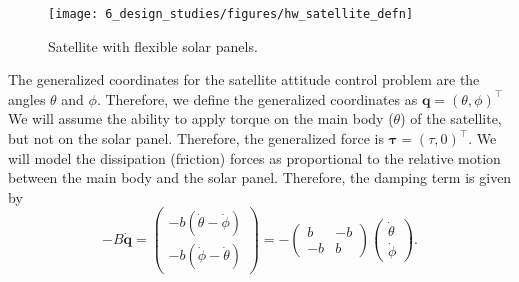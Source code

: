 
\begin{figure}[hbt]
  \centering\texttt{[image: 6\_design\_studies/figures/hw\_satellite\_defn]}
  \caption{Satellite with flexible solar panels.}
  \label{fig:sm_satellite_defn}  
\end{figure}



The generalized coordinates for the satellite attitude control problem are the angles $\theta$ and $\phi$.  Therefore, we define the generalized coordinates as $\mathbf{q}=(\theta, \phi)^\top$  We will assume the ability to apply torque on the main body ($\theta$) of the satellite, but not on the solar panel.  Therefore, the generalized force is $\boldsymbol{\tau} = (\tau, 0)^\top$.  We will model the dissipation (friction) forces as proportional to the relative motion between the main body and the solar panel.  Therefore, the damping term is given by
\[
-B\dot{\mathbf{q}} = \begin{pmatrix}-b(\dot{\theta}-\dot{\phi}) \\ -b(\dot{\phi}-\dot{\theta}) \end{pmatrix} = -\begin{pmatrix} b & -b \\ -b & b \end{pmatrix}\begin{pmatrix}\dot{\theta} \\ \dot{\phi}\end{pmatrix}.
\]

